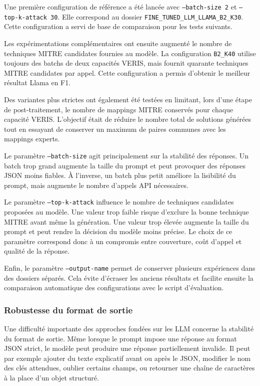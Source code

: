\documentclass[a4paper,12pt]{article}
\begin{document}
Une première configuration de référence a été lancée avec \texttt{--batch-size 2} et \texttt{--top-k-attack 30}. Elle correspond au dossier \texttt{FINE\_TUNED\_LLM\_LLAMA\_B2\_K30}. Cette configuration a servi de base de comparaison pour les tests suivants.

Les expérimentations complémentaires ont ensuite augmenté le nombre de techniques MITRE candidates fournies au modèle. La configuration \texttt{B2\_K40} utilise toujours des batchs de deux capacités VERIS, mais fournit quarante techniques MITRE candidates par appel. Cette configuration a permis d'obtenir le meilleur résultat Llama en F1.

Des variantes plus strictes ont également été testées en limitant, lors d'une étape de post-traitement, le nombre de mappings MITRE conservés pour chaque capacité VERIS. L'objectif était de réduire le nombre total de solutions générées tout en essayant de conserver un maximum de paires communes avec les mappings experts.

Le paramètre \texttt{--batch-size} agit principalement sur la stabilité des réponses. Un batch trop grand augmente la taille du prompt et peut provoquer des réponses JSON moins fiables. À l'inverse, un batch plus petit améliore la lisibilité du prompt, mais augmente le nombre d'appels API nécessaires.

Le paramètre \texttt{--top-k-attack} influence le nombre de techniques candidates proposées au modèle. Une valeur trop faible risque d'exclure la bonne technique MITRE avant même la génération. Une valeur trop élevée augmente la taille du prompt et peut rendre la décision du modèle moins précise. Le choix de ce paramètre correspond donc à un compromis entre couverture, coût d'appel et qualité de la réponse.

Enfin, le paramètre \texttt{--output-name} permet de conserver plusieurs expériences dans des dossiers séparés. Cela évite d'écraser les anciens résultats et facilite ensuite la comparaison automatique des configurations avec le script d'évaluation.

\subsubsection{Robustesse du format de sortie}

Une difficulté importante des approches fondées sur les LLM concerne la stabilité du format de sortie. Même lorsque le prompt impose une réponse au format JSON strict, le modèle peut produire une réponse partiellement invalide. Il peut par exemple ajouter du texte explicatif avant ou après le JSON, modifier le nom des clés attendues, oublier certains champs, ou retourner une chaîne de caractères à la place d'un objet structuré.
\end{document}
